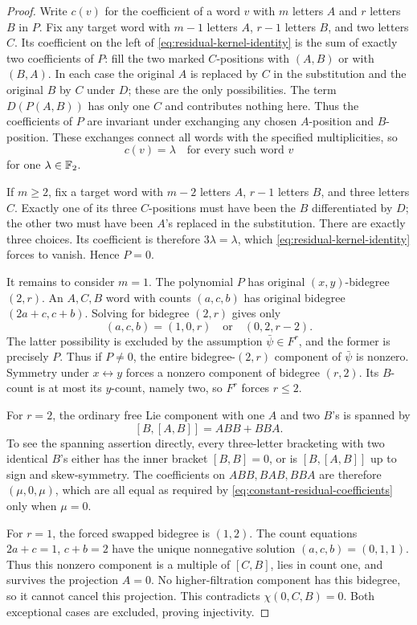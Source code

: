 \begin{proof}
Write $c(v)$ for the coefficient of a word $v$ with $m$ letters $A$
and $r$ letters $B$ in $P$.  Fix any target word with $m-1$ letters
$A$, $r-1$ letters $B$, and two letters $C$.  Its coefficient on the
left of \eqref{eq:residual-kernel-identity} is the sum of exactly two
coefficients of $P$: fill the two marked $C$-positions with $(A,B)$
or with $(B,A)$.  In each case the original $A$ is replaced by $C$
in the substitution and the original $B$ by $C$ under $D$; these are
the only possibilities.  The term $D(P(A,B))$ has only one $C$ and
contributes nothing here.  Thus the coefficients of $P$ are invariant
under exchanging any chosen $A$-position and $B$-position.  These
exchanges connect all words with the specified multiplicities, so
\begin{equation}\label{eq:constant-residual-coefficients}
 c(v)=\lambda\quad\text{for every such word }v
\end{equation}
for one $\lambda\in{\mathbb F_2}$.

If $m\geq2$, fix a target word with $m-2$ letters $A$, $r-1$ letters
$B$, and three letters $C$.  Exactly one of its three $C$-positions
must have been the $B$ differentiated by $D$; the other two must have
been $A$'s replaced in the substitution.  There are exactly three
choices.  Its coefficient is therefore $3\lambda=\lambda$, which
\eqref{eq:residual-kernel-identity} forces to vanish.  Hence $P=0$.

It remains to consider $m=1$.  The polynomial $P$ has original
$(x,y)$-bidegree $(2,r)$.  An $A,C,B$ word with counts $(a,c,b)$ has
original bidegree $(2a+c,c+b)$.  Solving for bidegree $(2,r)$ gives
only
\[
 (a,c,b)=(1,0,r)\quad\text{or}\quad(0,2,r-2).
\]
The latter possibility is excluded by the assumption
$\bar\psi\in F^r$, and the former is precisely $P$.  Thus if $P\ne0$,
the entire bidegree-$(2,r)$ component of $\bar\psi$ is nonzero.
Symmetry under $x\leftrightarrow y$ forces a nonzero component of
bidegree $(r,2)$.  Its $B$-count is at most its $y$-count, namely two,
so $F^r$ forces $r\leq2$.

For $r=2$, the ordinary free Lie component with one $A$ and two $B$'s
is spanned by
\[
 [B,[A,B]]=ABB+BBA.
\]
To see the spanning assertion directly, every three-letter bracketing
with two identical $B$'s either has the inner bracket $[B,B]=0$, or
is $[B,[A,B]]$ up to sign and skew-symmetry.  The coefficients on
$ABB,BAB,BBA$ are therefore $(\mu,0,\mu)$, which are all equal as
required by \eqref{eq:constant-residual-coefficients} only when
$\mu=0$.

For $r=1$, the forced swapped bidegree is $(1,2)$.  The count equations
$2a+c=1$, $c+b=2$ have the unique nonnegative solution
$(a,c,b)=(0,1,1)$.  Thus this nonzero component is a multiple of
$[C,B]$, lies in count one, and survives the projection $A=0$.
No higher-filtration component has this bidegree, so it cannot cancel
this projection.  This contradicts $\chi(0,C,B)=0$.  Both exceptional
cases are excluded, proving injectivity.
\end{proof}
